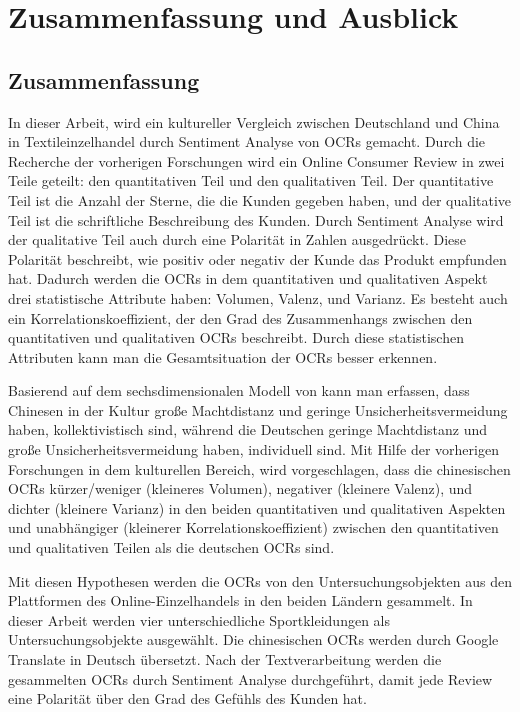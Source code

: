 \chapter{Zusammenfassung und Ausblick}
\section{Zusammenfassung}
In dieser Arbeit, wird ein kultureller Vergleich zwischen Deutschland und China in Textileinzelhandel durch Sentiment Analyse von \acl{OCRs} gemacht. Durch die Recherche der vorherigen Forschungen wird ein Online Consumer Review in zwei Teile geteilt: den quantitativen Teil und den qualitativen Teil. Der quantitative Teil ist die Anzahl der Sterne, die die Kunden gegeben haben, und der qualitative Teil ist die schriftliche Beschreibung des Kunden. Durch Sentiment Analyse wird der qualitative Teil auch durch eine Polarität in Zahlen ausgedrückt. Diese Polarität beschreibt, wie positiv oder negativ der Kunde das Produkt empfunden hat. Dadurch werden die \ac{OCRs} in dem quantitativen und qualitativen Aspekt drei statistische Attribute haben: Volumen, Valenz, und Varianz. Es besteht auch ein Korrelationskoeffizient, der den Grad des Zusammenhangs zwischen den quantitativen und qualitativen \ac{OCRs} beschreibt. Durch diese statistischen Attributen kann man die Gesamtsituation der \ac{OCRs} besser erkennen.

Basierend auf dem sechsdimensionalen Modell von \citeauthor{hofstede2013interkulturelle} kann man erfassen, dass Chinesen in der Kultur große Machtdistanz und geringe Unsicherheitsvermeidung haben, kollektivistisch sind, während die Deutschen geringe Machtdistanz und große Unsicherheitsvermeidung haben, individuell sind. Mit Hilfe der vorherigen Forschungen in dem kulturellen Bereich, wird vorgeschlagen, dass die chinesischen \ac{OCRs} kürzer/weniger (kleineres Volumen), negativer (kleinere Valenz), und dichter (kleinere Varianz) in den beiden quantitativen und qualitativen Aspekten und unabhängiger (kleinerer Korrelationskoeffizient) zwischen den quantitativen und qualitativen Teilen als die deutschen \ac{OCRs} sind.

Mit diesen Hypothesen werden die \ac{OCRs} von den Untersuchungsobjekten aus den Plattformen des Online-Einzelhandels in den beiden Ländern gesammelt. In dieser Arbeit werden vier unterschiedliche Sportkleidungen als Untersuchungsobjekte ausgewählt. Die chinesischen \ac{OCRs} werden durch Google Translate in Deutsch übersetzt. Nach der Textverarbeitung werden die gesammelten \ac{OCRs} durch Sentiment Analyse durchgeführt, damit jede Review eine Polarität über den Grad des Gefühls des Kunden hat. 


